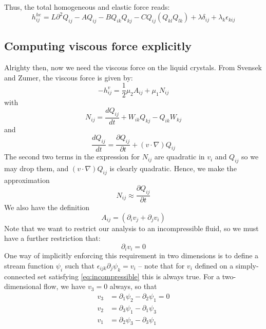 \documentclass[reqno]{article}
\begin{document}
	Thus, the total homogeneous and elastic force reads:
	\begin{equation}\label{eq:hom-el-force}
		h^{he}_{ij} = L\partial^2 Q_{ij} - A Q_{ij} - BQ_{ik}Q_{kj} - C Q_{ij} (Q_{kl}Q_{lk}) + \lambda\delta_{ij} + \lambda_k \epsilon_{kij}
	\end{equation}
	
	\subsection{Computing viscous force explicitly}
	Alrighty then, now we need the viscous force on the liquid crystals. From Svensek and Zumer, the viscous force is given by:
	\begin{equation}
		-h^v_{ij} = \frac{1}{2} \mu_2 A_{ij} + \mu_1 N_{ij}
	\end{equation}
	with 
	\begin{equation}
		N_{ij} = \frac{d Q_{ij}}{dt} + W_{ik} Q_{kj} - Q_{ik} W_{kj}
	\end{equation}
	and
	\begin{equation}
		\frac{d Q_{ij}}{dt} = \frac{\partial Q_{ij}}{\partial t} + (v\cdot \nabla)Q_{ij}
	\end{equation}
	The second two terms in the expression for $N_{ij}$ are quadratic in $v_i$ and $Q_{ij}$ so we may drop them, and $(v\cdot \nabla)Q_{ij}$ is clearly quadratic. Hence, we make the approximation
	\begin{equation}
		N_{ij} \approx \frac{\partial Q_{ij}}{\partial t}
	\end{equation}
	We also have the definition
	\begin{equation}
		A_{ij} = (\partial_i v_j + \partial_j v_i)
	\end{equation}
	Note that we want to restrict our analysis to an incompressible fluid, so we must have a further restriction that:
	\begin{equation}\label{eq:incompressible}
		\partial_i v_i = 0
	\end{equation}
	One way of implicitly enforcing this requirement in two dimensions is to define a stream function $\psi_i$ such that $\epsilon_{ijk}\partial_j \psi_k = v_i$ -- note that for $v_i$ defined on a simply-connected set satisfying \eqref{eq:incompressible} this is always true. For a two-dimensional flow, we have $v_3 = 0$ always, so that 
	\begin{equation}
	\begin{split}
		v_3 &= \partial_1 \psi_2 - \partial_2 \psi_1 = 0 \\
		v_2 &= \partial_3 \psi_1 - \partial_1 \psi_3 \\
		v_1 &= \partial_2 \psi_3 - \partial_3 \psi_1
	\end{split}
	\end{equation}
\end{document}
